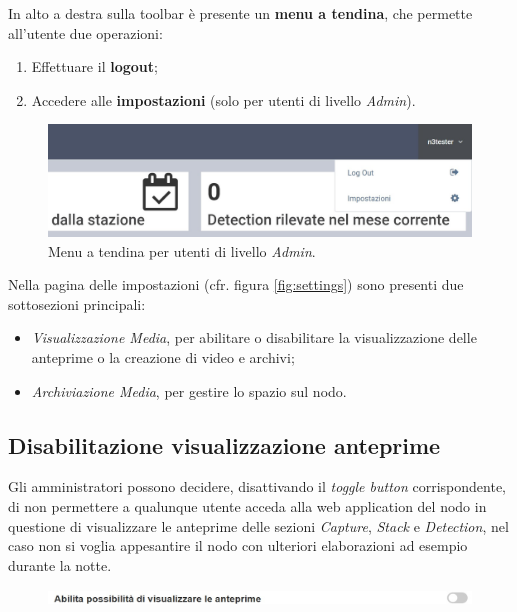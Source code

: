 In alto a destra sulla toolbar è presente un \textbf{menu a tendina}, che permette all'utente due operazioni:
\begin{enumerate}
    \item Effettuare il \textbf{logout};
    \item Accedere alle \textbf{impostazioni} (solo per utenti di livello \emph{Admin}).
\end{enumerate}
\begin{figure}[H]
    \includegraphics[width=\textwidth]{images/drop-down-menu.jpg}
    \caption{Menu a tendina per utenti di livello \emph{Admin}.}
\end{figure}
Nella pagina delle impostazioni (cfr. figura \ref{fig:settings}) sono presenti due sottosezioni principali:
\begin{itemize}[noitemsep,nolistsep]
    \item \emph{Visualizzazione Media}, per abilitare o disabilitare la visualizzazione delle anteprime o la creazione di video e archivi;
    \item \emph{Archiviazione Media}, per gestire lo spazio sul nodo.
\end{itemize}

\subsection{Disabilitazione visualizzazione anteprime}

Gli amministratori possono decidere, disattivando il \emph{toggle button} corrispondente, di non permettere a qualunque utente acceda alla web application del nodo in questione di visualizzare le anteprime delle sezioni \emph{Capture}, \emph{Stack} e \emph{Detection}, nel caso non si voglia appesantire il nodo con ulteriori elaborazioni ad esempio durante la notte.

\begin{figure}[H]
    \includegraphics[width=\textwidth]{images/no-preview-toggle.jpg}
\end{figure}

